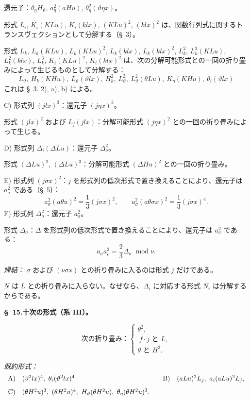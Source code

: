 \documentclass[11pt]{jlreq}
\newcommand{\A}{\Delta}
\newcommand{\R}{\varrho}
\newcommand{\modu}[1]{\;\operatorname{mod} #1}
\begin{document}
還元子：$\theta_\eta H_\vartheta$, $a_\eta^2(aHu)$, $\theta_\eta^2(\vartheta\eta x)$。

形式 $L_i$, $K_i(KLu)$, $K_i(klx)$, $(KLu)^2$, $(klx)^2$ は、関数行列式に関するトランスヴェクションとして分解する（\S\ 3）。

形式 $L_k$, $L_k(KLu)$, $L_k(KLu)^2$, $L_k(klx)$, $L_k(klx)^2$, $L_k^2$, $L_k^2(KLu)$, $L_k^2(klx)$, $L_k^3$, $K_i(KLu)^2$, $K_i(klx)^2$ は、次の分解可能形式との一回の折り畳みによって生じるものとして分解する：
\[
L_\vartheta,
\ H_k(KHu),
\ L_\vartheta(\vartheta lx),
\ H_k^2,
\ L_\vartheta^2,
\ L_\vartheta^2(\theta Lu),
\ K_\eta(KHu),
\ \theta_i(\vartheta lx)
\]
これは \S\ 3. 2), a), b) による。

C) 形式列 $(jlx)^3$：還元子 $(j\eta x)^3$。

形式 $(jlx)^2$ および $L_j(jlx)$：分解可能形式 $(j\eta x)^2$ との一回の折り畳みによって生じる。

D) 形式列 $\A_i(\A Lu)$：還元子 $\A_\nu^2$。

形式 $(\A Lu)^2$, $(\A Lu)^3$：分解可能形式 $(\A Hu)^2$ との一回の折り畳み。

E) 形式列 $(j\sigma x)^2$：$j$ を形式列の低次形式で置き換えることにより、還元子は $a_\sigma^2$ である（\S\ 5）：
\[
a_\sigma^2(a\theta u)^2=\frac13(j\sigma x)^2,
\qquad
a_\sigma^2(a\theta\sigma x)^2=\frac13(j\sigma x)^4.
\]
F) 形式列 $\A_\sigma^2$：還元子 $a_\sigma^2$。

形式 $\A_\sigma$：$\A$ を形式列の低次形式で置き換えることにより、還元子は $a_\sigma^2$ である：
\[
a_\sigma a_\R^2=\frac23\A_\sigma\modu{\nu}.
\]

\noindent\emph{帰結：} $\sigma$ および $(\nu\sigma x)$ との折り畳みに入るのは形式 $j$ だけである。

$N$ は $L$ との折り畳みに入らない。なぜなら、$\A_i$ に対応する形式 $N_i$ は分解するからである。

\begin{center}
\textbf{\S\ 15.\quad 十次の形式（系 III）。}
\end{center}
\[
\text{次の折り畳み：}\left\{\begin{array}{l}
\theta^2,\\
\ f\cdot j\text{ と }L,\\
\theta\text{ と }H^2.
\end{array}\right.
\]

\noindent\emph{既約形式：}
\[
\begin{array}{c@{\quad}l@{\qquad}c@{\quad}l}
\text{A)}&(\vartheta^2lx)^4,
\ \theta_i(\vartheta^2lx)^4&
\text{B)}&(aLu)^2L_j,
\ a_i(aLu)^2L_j,\\[0.8em]
\text{C)}&(\theta H^2u)^3,
\ (\theta H^2u)^4,
\ H_\vartheta(\theta H^2u),
\ \theta_\eta(\theta H^2u)^3.
\end{array}
\]
\end{document}
